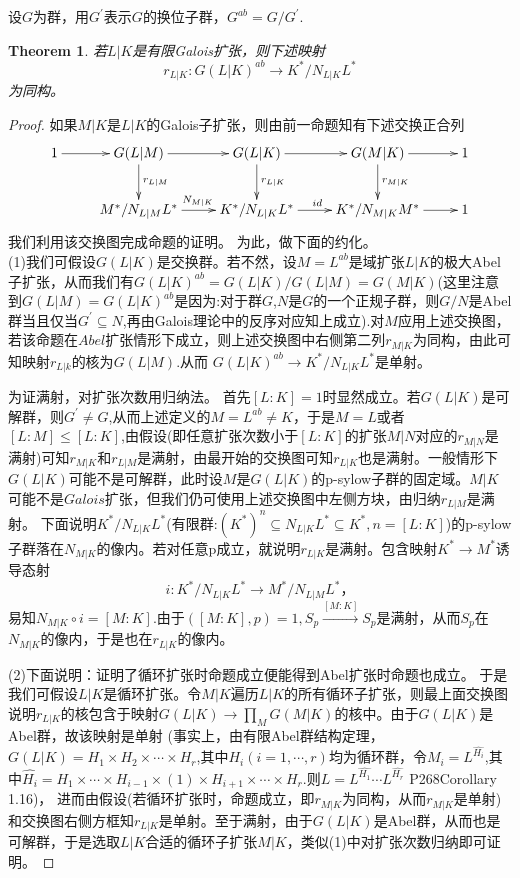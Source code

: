 \documentclass[UTF8]{article}
\newtheorem{thm}{Theorem}[section]
\begin{document}
设$G$为群，用$G^{'}$表示$G$的换位子群，$G^{ab}=G/G^{'}$.
\begin{thm}
	若$L|K$是有限Galois扩张，则下述映射
	$$
	r_{L|K}:G(L|K)^{ab}\rightarrow K^{*}/N_{L|K}L^{*} 
	$$
	为同构。
\end{thm}
\begin{proof}
	如果$M|K$是$L|K$的Galois子扩张，则由前一命题知有下述交换正合列
	$$
	\xymatrix{
1\ar[r]& G(L|M)\ar[r]\ar[d]^{r_{L|M}}&G(L|K)\ar[r]\ar[d]^{r_{L|K}}&G(M|K)\ar[r]\ar[d]^{r_{M|K}}&1\\
&M^{*}/N_{L|M}L^{*}\ar[r]^{N_{M|K}}&K^{*}/N_{L|K}L^{*}\ar[r]^{id}&K^{*}/N_{M|K}M^{*}\ar[r]&1	
}
	$$
我们利用该交换图完成命题的证明。
为此，做下面的约化。\\
(1)我们可假设$G(L|K)$是交换群。若不然，设$M=L^{ab}$是域扩张$L|K$的极大Abel子扩张，从而我们有$G(L|K)^{ab}=G(L|K)/G(L|M)=G(M|K)$(这里注意到$G(L|M)=G(L|K)^{ab}$是因为:对于群$G$,$N$是$G$的一个正规子群，则$G/N$是Abel群当且仅当$G^{'}\subseteq N $,再由Galois理论中的反序对应知上成立).对$M$应用上述交换图，若该命题在$Abel$扩张情形下成立，则上述交换图中右侧第二列$r_{M|K}$为同构，由此可知映射$r_{L|k}$的核为$G(L|M)$.从而
$G(L|K)^{ab}\rightarrow K^{*}/N_{L|K}L^{*}$是单射。

为证满射，对扩张次数用归纳法。
首先$[L:K]=1$时显然成立。若$G(L|K)$是可解群，则$G^{'}\neq G$,从而上述定义的$M=L^{ab}\neq K$，于是$M=L$或者$[L:M]\leq [L:K]$,由假设(即任意扩张次数小于$[L:K]$的扩张$M|N$对应的$r_{M|N}$是满射)可知$r_{M|K}$和$r_{L|M}$是满射，由最开始的交换图可知$r_{L|K}$也是满射。一般情形下$G(L|K)$可能不是可解群，此时设$M$是$G(L|K)$的p-sylow子群的固定域。$M|K$可能不是$Galois$扩张，但我们仍可使用上述交换图中左侧方块，由归纳$r_{L|M}$是满射。
下面说明$K^{*}/N_{L|K}L^{*}$(有限群:$(K^{*})^{n}\subseteq N_{L|K}L^{*}\subseteq K^{*},n=[L:K]$)的p-sylow子群落在$N_{M|K}$的像内。若对任意p成立，就说明$r_{L|K}$是满射。包含映射$K^{*}\rightarrow M^{*}$诱导态射
$$
i:K^{*}/N_{L|K}L^{*}\rightarrow M^{*}/N_{L|M}L^{*}，
$$
易知$N_{M|K}\circ i=[M:K]$.由于$([M:K],p)=1,S_{p}\stackrel{[M:K]}{\rightarrow} S_{p}$是满射，从而$S_{p}$在$N_{M|K}$的像内，于是也在$r_{L|K}$的像内。

	(2)下面说明：证明了循环扩张时命题成立便能得到Abel扩张时命题也成立。 于是我们可假设$L|K$是循环扩张。令$M|K$遍历$L|K$的所有循环子扩张，则最上面交换图说明$r_{L|K}$的核包含于映射$G(L|K)\rightarrow \prod_{M}G(M|K)$的核中。由于$G(L|K)$是Abel群，故该映射是单射
	(事实上，由有限Abel群结构定理，$G(L|K)=H_{1}\times H_{2}\times \cdots\times H_{r} $,其中$H_{i}(i=1,\cdots,r)$均为循环群，令$M_{i}=L^{\widehat{H_{i}}}$,其中$\widehat{H_{i}}=H_{1}\times\cdots \times H_{i-1}\times(1)\times H_{i+1}\times\cdots\times H_{r}.$则$L=L^{\widehat{H_{1}}}\cdots L^{\widehat{H_{r}}}$ \cite{lang} P268Corollary 1.16)，
	进而由假设(若循环扩张时，命题成立，即$r_{M|K}$为同构，从而$r_{M|K}$是单射)和交换图右侧方框知$r_{L|K}$是单射。至于满射，由于$G(L|K)$是Abel群，从而也是可解群，于是选取$L|K$合适的循环子扩张$M|K$，类似(1)中对扩张次数归纳即可证明。
	

\end{proof}
\end{document}
